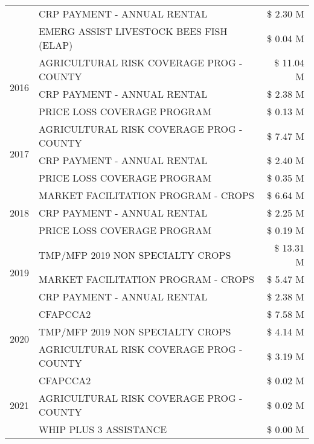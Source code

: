 \begin{tabular}{llr}
 & CRP PAYMENT - ANNUAL RENTAL & \$ 2.30 M \\
 & EMERG ASSIST LIVESTOCK BEES FISH (ELAP) & \$ 0.04 M \\
\cline{1-3}
\multirow[t]{3}{*}{2016} & AGRICULTURAL RISK COVERAGE PROG - COUNTY & \$ 11.04 M \\
 & CRP PAYMENT - ANNUAL RENTAL & \$ 2.38 M \\
 & PRICE LOSS COVERAGE PROGRAM & \$ 0.13 M \\
\cline{1-3}
\multirow[t]{3}{*}{2017} & AGRICULTURAL RISK COVERAGE PROG - COUNTY & \$ 7.47 M \\
 & CRP PAYMENT - ANNUAL RENTAL & \$ 2.40 M \\
 & PRICE LOSS COVERAGE PROGRAM & \$ 0.35 M \\
\cline{1-3}
\multirow[t]{3}{*}{2018} & MARKET FACILITATION PROGRAM - CROPS & \$ 6.64 M \\
 & CRP PAYMENT - ANNUAL RENTAL & \$ 2.25 M \\
 & PRICE LOSS COVERAGE PROGRAM & \$ 0.19 M \\
\cline{1-3}
\multirow[t]{3}{*}{2019} & TMP/MFP 2019 NON SPECIALTY CROPS & \$ 13.31 M \\
 & MARKET FACILITATION PROGRAM - CROPS & \$ 5.47 M \\
 & CRP PAYMENT - ANNUAL RENTAL & \$ 2.38 M \\
\cline{1-3}
\multirow[t]{3}{*}{2020} & CFAPCCA2 & \$ 7.58 M \\
 & TMP/MFP 2019 NON SPECIALTY CROPS & \$ 4.14 M \\
 & AGRICULTURAL RISK COVERAGE PROG - COUNTY & \$ 3.19 M \\
\cline{1-3}
\multirow[t]{3}{*}{2021} & CFAPCCA2 & \$ 0.02 M \\
 & AGRICULTURAL RISK COVERAGE PROG - COUNTY & \$ 0.02 M \\
 & WHIP PLUS 3 ASSISTANCE & \$ 0.00 M \\
\cline{1-3}
\bottomrule
\end{tabular}
